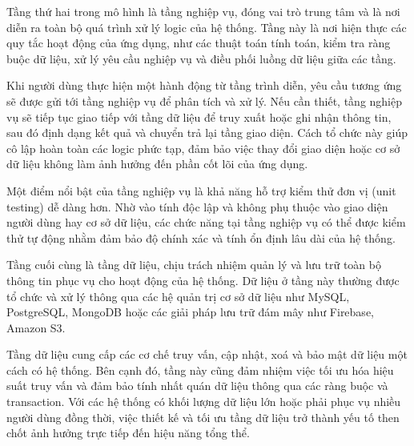   
  \hspace*{0.8cm}Tầng thứ hai trong mô hình là tầng nghiệp vụ, đóng vai trò trung tâm và là nơi diễn ra toàn bộ quá trình xử lý logic của hệ thống. Tầng này là nơi hiện thực các quy tắc hoạt động của ứng dụng, như các thuật toán tính toán, kiểm tra ràng buộc dữ liệu, xử lý yêu cầu nghiệp vụ và điều phối luồng dữ liệu giữa các tầng.
  \vspace{0.5em}
  
  
  \hspace*{0.8cm}Khi người dùng thực hiện một hành động từ tầng trình diễn, yêu cầu tương ứng sẽ được gửi tới tầng nghiệp vụ để phân tích và xử lý. Nếu cần thiết, tầng nghiệp vụ sẽ tiếp tục giao tiếp với tầng dữ liệu để truy xuất hoặc ghi nhận thông tin, sau đó định dạng kết quả và chuyển trả lại tầng giao diện. Cách tổ chức này giúp cô lập hoàn toàn các logic phức tạp, đảm bảo việc thay đổi giao diện hoặc cơ sở dữ liệu không làm ảnh hưởng đến phần cốt lõi của ứng dụng.
  \vspace{0.5em}
  
  
  \hspace*{0.8cm}Một điểm nổi bật của tầng nghiệp vụ là khả năng hỗ trợ kiểm thử đơn vị (unit testing) dễ dàng hơn. Nhờ vào tính độc lập và không phụ thuộc vào giao diện người dùng hay cơ sở dữ liệu, các chức năng tại tầng nghiệp vụ có thể được kiểm thử tự động nhằm đảm bảo độ chính xác và tính ổn định lâu dài của hệ thống.
  \vspace{0.5em}
  
  
  \hspace*{0.8cm}Tầng cuối cùng là tầng dữ liệu, chịu trách nhiệm quản lý và lưu trữ toàn bộ thông tin phục vụ cho hoạt động của hệ thống. Dữ liệu ở tầng này thường được tổ chức và xử lý thông qua các hệ quản trị cơ sở dữ liệu như MySQL, PostgreSQL, MongoDB hoặc các giải pháp lưu trữ đám mây như Firebase, Amazon S3.
  \vspace{0.5em}
  
  
  \hspace*{0.8cm}Tầng dữ liệu cung cấp các cơ chế truy vấn, cập nhật, xoá và bảo mật dữ liệu một cách có hệ thống. Bên cạnh đó, tầng này cũng đảm nhiệm việc tối ưu hóa hiệu suất truy vấn và đảm bảo tính nhất quán dữ liệu thông qua các ràng buộc và transaction. Với các hệ thống có khối lượng dữ liệu lớn hoặc phải phục vụ nhiều người dùng đồng thời, việc thiết kế và tối ưu tầng dữ liệu trở thành yếu tố then chốt ảnh hưởng trực tiếp đến hiệu năng tổng thể.
  \vspace{0.5em}
  
